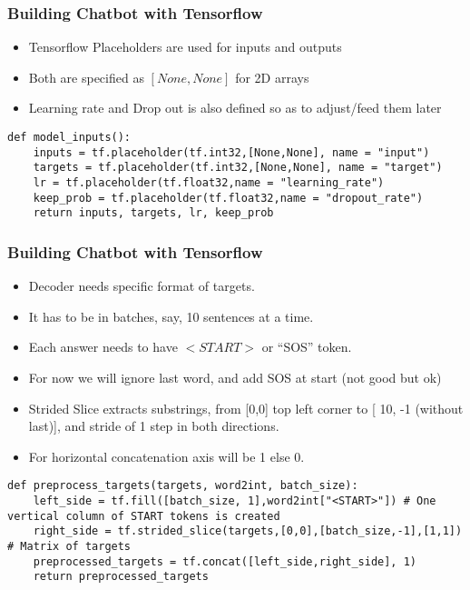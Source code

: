 \begin{frame}[fragile]\frametitle{Building Chatbot with Tensorflow}
\begin{itemize}
\item Tensorflow Placeholders are used for inputs and outputs
\item Both are specified as $[None,None]$ for 2D arrays
\item Learning rate and Drop out is also defined so as to adjust/feed them later
\end{itemize}

\begin{lstlisting}
def model_inputs():
    inputs = tf.placeholder(tf.int32,[None,None], name = "input")
    targets = tf.placeholder(tf.int32,[None,None], name = "target")
    lr = tf.placeholder(tf.float32,name = "learning_rate")
    keep_prob = tf.placeholder(tf.float32,name = "dropout_rate")
    return inputs, targets, lr, keep_prob
\end{lstlisting}

\end{frame}


\begin{frame}[fragile]\frametitle{Building Chatbot with Tensorflow}
\begin{itemize}
\item Decoder needs specific format of targets. 
\item It has to be in batches, say, 10 sentences at a time.
\item Each answer needs to have $<START>$ or ``SOS'' token.
\item For now we will ignore last word, and add SOS at start (not good but ok)
\item Strided Slice extracts substrings, from [0,0] top left corner to [ 10, -1 (without last)], and stride of 1 step in both directions.
\item For horizontal concatenation axis will be 1 else 0.
\end{itemize}

\begin{lstlisting}
def preprocess_targets(targets, word2int, batch_size):
    left_side = tf.fill([batch_size, 1],word2int["<START>"]) # One vertical column of START tokens is created
    right_side = tf.strided_slice(targets,[0,0],[batch_size,-1],[1,1]) # Matrix of targets
    preprocessed_targets = tf.concat([left_side,right_side], 1)
    return preprocessed_targets
\end{lstlisting}

\end{frame}



